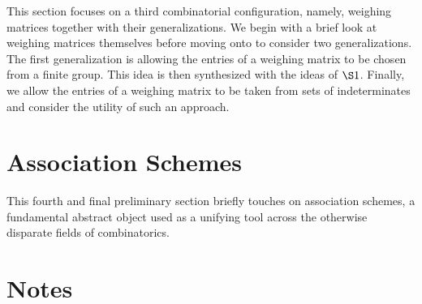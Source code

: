 \documentclass[../../main]{subfiles}
\begin{document}
This section focuses on a third combinatorial configuration, namely, weighing 
matrices together with their generalizations. We begin with a brief look at
weighing matrices themselves before moving onto to consider two generalizations.
The first generalization is allowing the entries of a weighing matrix to be
chosen from a finite group. This idea is then synthesized with the ideas of
$\S1$. Finally, we allow the entries of a weighing matrix to be taken from sets
of indeterminates and consider the utility of such an approach. 

\dinkus



\fancyhf{}

\fancyhead[RO,LE]{\thepage} 

\section{Association Schemes}

This fourth and final preliminary section briefly touches on association
schemes, a fundamental abstract object used as a unifying tool across the
otherwise disparate fields of combinatorics.  

\dinkus



\singlespace

\fancyhf{}

\fancyhead[RO,LE]{\thepage} 

\section*{\centering Notes}
\theanotes

\doublespacing

\biblio
\end{document}
